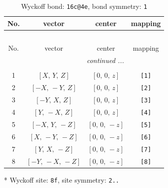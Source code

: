 \documentclass[fleqn,8pt]{jsarticle}
\begin{document}
\begin{longtable}{cccc}
\caption{Wyckoff bond: {\tt 16c@4e}, bond symmetry: {\tt 1}}
 \\
 \hline \hline
No. & vector & center & mapping \\ \hline \endfirsthead

\multicolumn{3}{l}{\tablename\ \thetable{}} \\
 \hline \hline
No. & vector & center & mapping \\ \hline \endhead

 \hline \hline
\multicolumn{3}{r}{\footnotesize\it continued ...} \\ \endfoot

 \hline \hline
\multicolumn{3}{r}{} \\ \endlastfoot

1 & $\left[ X,\, Y,\, Z \right]$ & $\left[ 0,\, 0,\, z \right]$ & {\tt [1]} \\ \hline
2 & $\left[ - X,\, - Y,\, Z \right]$ & $\left[ 0,\, 0,\, z \right]$ & {\tt [2]} \\ \hline
3 & $\left[ - Y,\, X,\, Z \right]$ & $\left[ 0,\, 0,\, z \right]$ & {\tt [3]} \\ \hline
4 & $\left[ Y,\, - X,\, Z \right]$ & $\left[ 0,\, 0,\, z \right]$ & {\tt [4]} \\ \hline
5 & $\left[ - X,\, Y,\, - Z \right]$ & $\left[ 0,\, 0,\, - z \right]$ & {\tt [5]} \\ \hline
6 & $\left[ X,\, - Y,\, - Z \right]$ & $\left[ 0,\, 0,\, - z \right]$ & {\tt [6]} \\ \hline
7 & $\left[ Y,\, X,\, - Z \right]$ & $\left[ 0,\, 0,\, - z \right]$ & {\tt [7]} \\ \hline
8 & $\left[ - Y,\, - X,\, - Z \right]$ & $\left[ 0,\, 0,\, - z \right]$ & {\tt [8]} \\
\end{longtable}
* Wyckoff site: {\tt 8f}, site symmetry: {\tt 2..}
\renewcommand{\arraystretch}{1.2}
\end{document}
